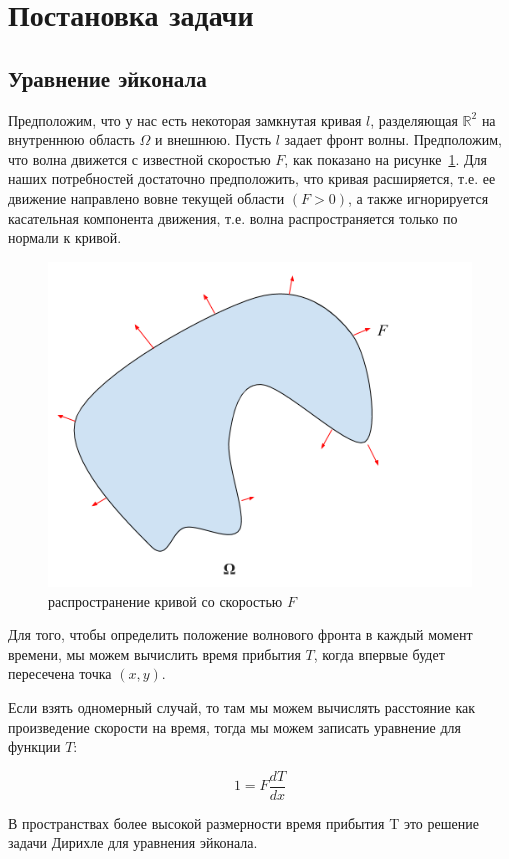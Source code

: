 \section{Постановка задачи}
\label{sec:theory}

\subsection {Уравнение эйконала}
\label{sec:csdisttrack}


Предположим, что у нас есть некоторая замкнутая кривая $l$,
разделяющая $\mathbb{R}^2$ на внутреннюю область $\Omega$ и
внешнюю. Пусть $l$ задает фронт волны. Предположим, что волна движется
с известной скоростью $F$, как показано на
рисунке~\ref{fig:eikvis}. Для наших потребностей достаточно
предположить, что кривая расширяется, т.е. ее движение направлено
вовне текущей области $(F>0)$, а также игнорируется касательная
компонента движения, т.е. волна распространяется только по
нормали к кривой.

\begin{figure}[h]
  \centering
  \includegraphics[width=0.5\linewidth]{img/eikonal_vision.png}
  \hfil \caption{распространение кривой со скоростью $F$}
  \label{fig:eikvis}
\end{figure}


Для того, чтобы определить положение волнового фронта в каждый момент
времени, мы можем вычислить время прибытия $T$, когда впервые будет
пересечена точка $(x,y)$.

Если взять одномерный случай, то там мы можем вычислять расстояние как
произведение скорости на время, тогда мы можем записать уравнение для
функции $T$:

\begin{equation*}
  1 = F \frac{dT}{dx}
\end{equation*}

В пространствах более высокой размерности время прибытия T это решение
задачи Дирихле для уравнения эйконала.

